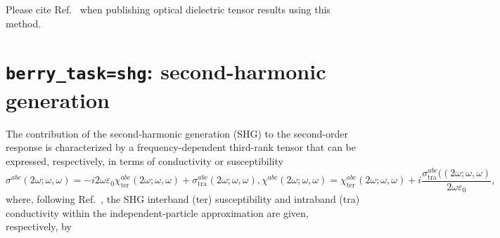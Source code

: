 Please cite Ref.~\cite{garcia-goiricelaya-prb23} when publishing optical dielectric tensor results using this method.

\section{{\tt berry\_task=shg}: second-harmonic generation}

The contribution of the second-harmonic generation (SHG) to the second-order response is characterized by a frequency-dependent third-rank tensor that can be expressed, respectively, in terms of conductivity or susceptibility~\cite{garcia-goiricelaya-prb23}
\begin{subequations}
 \begin{equation}
  \sigma^{abc}(2\omega;\omega,\omega)=-i2\omega\varepsilon_{0}\chi_{\text{ter}}^{abc}(2\omega;\omega,\omega)+\sigma_{\text{tra}}^{abc}(2\omega;\omega,\omega),
 \end{equation}
 \begin{equation}
  \chi^{abc}(2\omega;\omega,\omega)=\chi_{\text{ter}}^{abc}(2\omega;\omega,\omega)+i\frac{\sigma_{\text{tra}}^{abc}((2\omega;\omega,\omega)}{2\omega\varepsilon_{0}},
 \end{equation}
\end{subequations}
where, following Ref.~\cite{sipe-prb00}, the SHG interband (ter) susceptibility and intraband (tra) conductivity within the independent-particle approximation are given, respectively, by
